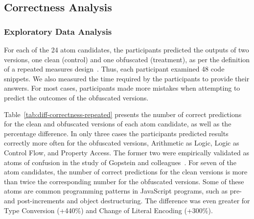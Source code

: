 \subsection{Correctness Analysis}\label{sec:repeated:correct}

\subsubsection*{Exploratory Data Analysis}
For each of the 24 atom candidates, the participants predicted the outputs of two versions, one clean (control) and one obfuscated (treatment), as per the definition of a repeated measures design~\cite{Hunter-Experimenters}. Thus, each participant examined 48 code snippets.  We also measured the time required by the participants to provide their answers. For most cases, participants made more mistakes when attempting to predict the outcomes of the obfuscated versions. 

Table~\ref{tab:diff-correctness-repeated} presents the number of correct predictions for the clean and obfuscated versions of each atom candidate, as well as the percentage difference. In only three cases the participants predicted results correctly more often for the obfuscated versions, Arithmetic as Logic, Logic as Control Flow, and Property Access. The former two were empirically validated as atoms of confusion in the study of Gopstein and colleagues~\cite{DBLP:conf/sigsoft/GopsteinIYDZYC17}. For seven of the atom candidates, the number of correct predictions for the clean versions is more than twice the corresponding number for the obfuscated versions.  Some of these atoms are common programming patterns in JavaScript programs, such as pre- and post-increments and object destructuring. The difference was even greater for Type Conversion (+440\%) and Change of Literal Encoding (+300\%). 

